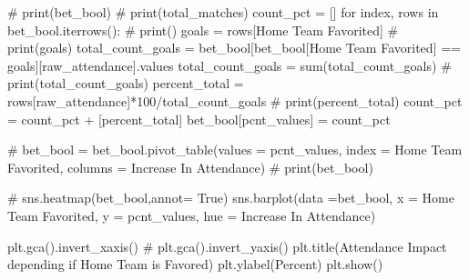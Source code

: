 \documentclass[
  letterpaper,
  DIV=11,
  numbers=noendperiod]{scrartcl}
\newenvironment{Shaded}{\begin{snugshade}}{\end{snugshade}}
\newcommand{\BuiltInTok}[1]{\textcolor[rgb]{0.00,0.23,0.31}{#1}}
\newcommand{\CommentTok}[1]{\textcolor[rgb]{0.37,0.37,0.37}{#1}}
\newcommand{\ControlFlowTok}[1]{\textcolor[rgb]{0.00,0.23,0.31}{#1}}
\newcommand{\DecValTok}[1]{\textcolor[rgb]{0.68,0.00,0.00}{#1}}
\newcommand{\KeywordTok}[1]{\textcolor[rgb]{0.00,0.23,0.31}{#1}}
\newcommand{\NormalTok}[1]{\textcolor[rgb]{0.00,0.23,0.31}{#1}}
\newcommand{\OperatorTok}[1]{\textcolor[rgb]{0.37,0.37,0.37}{#1}}
\newcommand{\StringTok}[1]{\textcolor[rgb]{0.13,0.47,0.30}{#1}}
\begin{document}
\begin{Shaded}
\begin{Highlighting}[]
\CommentTok{\# print(bet\_bool)}
\CommentTok{\# print(total\_matches)}
\NormalTok{count\_pct }\OperatorTok{=}\NormalTok{ []}
\ControlFlowTok{for}\NormalTok{ index, rows }\KeywordTok{in}\NormalTok{ bet\_bool.iterrows():}
    \CommentTok{\# print(\textquotesingle{}{-}{-}{-}{-}{-}{-}{-}{-}{-}{-}\textquotesingle{})}
\NormalTok{    goals }\OperatorTok{=}\NormalTok{ rows[}\StringTok{\textquotesingle{}Home Team Favorited\textquotesingle{}}\NormalTok{]}
    \CommentTok{\# print(goals)}
\NormalTok{    total\_count\_goals }\OperatorTok{=}\NormalTok{ bet\_bool[bet\_bool[}\StringTok{\textquotesingle{}Home Team Favorited\textquotesingle{}}\NormalTok{] }\OperatorTok{==}\NormalTok{ goals][}\StringTok{\textquotesingle{}raw\_attendance\textquotesingle{}}\NormalTok{].values}
\NormalTok{    total\_count\_goals }\OperatorTok{=} \BuiltInTok{sum}\NormalTok{(total\_count\_goals)}
    \CommentTok{\# print(total\_count\_goals)}
\NormalTok{    percent\_total }\OperatorTok{=}\NormalTok{ rows[}\StringTok{\textquotesingle{}raw\_attendance\textquotesingle{}}\NormalTok{]}\OperatorTok{*}\DecValTok{100}\OperatorTok{/}\NormalTok{total\_count\_goals}
    \CommentTok{\# print(percent\_total)}
\NormalTok{    count\_pct }\OperatorTok{=}\NormalTok{ count\_pct }\OperatorTok{+}\NormalTok{ [percent\_total]}
\NormalTok{bet\_bool[}\StringTok{\textquotesingle{}pcnt\_values\textquotesingle{}}\NormalTok{]  }\OperatorTok{=}\NormalTok{ count\_pct}


\CommentTok{\# bet\_bool = bet\_bool.pivot\_table(values = \textquotesingle{}pcnt\_values\textquotesingle{}, index = \textquotesingle{}Home Team Favorited\textquotesingle{}, columns = \textquotesingle{}Increase In Attendance\textquotesingle{})}
\CommentTok{\# print(bet\_bool)}

\CommentTok{\# sns.heatmap(bet\_bool,annot= True)}
\NormalTok{sns.barplot(data }\OperatorTok{=}\NormalTok{bet\_bool, x }\OperatorTok{=} \StringTok{\textquotesingle{}Home Team Favorited\textquotesingle{}}\NormalTok{, y }\OperatorTok{=} \StringTok{\textquotesingle{}pcnt\_values\textquotesingle{}}\NormalTok{, hue }\OperatorTok{=} \StringTok{\textquotesingle{}Increase In Attendance\textquotesingle{}}\NormalTok{)}

\NormalTok{plt.gca().invert\_xaxis()}
\CommentTok{\# plt.gca().invert\_yaxis()}
\NormalTok{plt.title(}\StringTok{\textquotesingle{}Attendance Impact depending if Home Team is Favored\textquotesingle{}}\NormalTok{)}
\NormalTok{plt.ylabel(}\StringTok{\textquotesingle{}Percent\textquotesingle{}}\NormalTok{)}
\NormalTok{plt.show()}
\end{Highlighting}
\end{Shaded}
\end{document}
